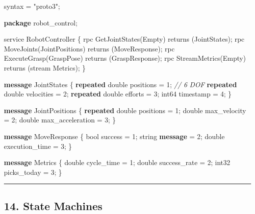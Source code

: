 \documentclass[
]{article}
\newenvironment{Shaded}{\begin{snugshade}}{\end{snugshade}}
\newcommand{\CommentTok}[1]{\textcolor[rgb]{0.56,0.35,0.01}{\textit{#1}}}
\newcommand{\DataTypeTok}[1]{\textcolor[rgb]{0.13,0.29,0.53}{#1}}
\newcommand{\DecValTok}[1]{\textcolor[rgb]{0.00,0.00,0.81}{#1}}
\newcommand{\KeywordTok}[1]{\textcolor[rgb]{0.13,0.29,0.53}{\textbf{#1}}}
\newcommand{\NormalTok}[1]{#1}
\newcommand{\StringTok}[1]{\textcolor[rgb]{0.31,0.60,0.02}{#1}}
\begin{document}
\begin{Shaded}
\begin{Highlighting}[]
\NormalTok{syntax = }\StringTok{"proto3"}\NormalTok{;}

\KeywordTok{package}\NormalTok{ robot\_control;}

\NormalTok{service RobotController \{}
\NormalTok{    rpc GetJointStates(Empty) returns (JointStates);}
\NormalTok{    rpc MoveJoints(JointPositions) returns (MoveResponse);}
\NormalTok{    rpc ExecuteGrasp(GraspPose) returns (GraspResponse);}
\NormalTok{    rpc StreamMetrics(Empty) returns (stream Metrics);}
\NormalTok{\}}

\KeywordTok{message}\NormalTok{ JointStates \{}
    \KeywordTok{repeated} \DataTypeTok{double}\NormalTok{ positions = }\DecValTok{1}\NormalTok{;  }\CommentTok{// 6 DOF}
    \KeywordTok{repeated} \DataTypeTok{double}\NormalTok{ velocities = }\DecValTok{2}\NormalTok{;}
    \KeywordTok{repeated} \DataTypeTok{double}\NormalTok{ efforts = }\DecValTok{3}\NormalTok{;}
    \DataTypeTok{int64}\NormalTok{ timestamp = }\DecValTok{4}\NormalTok{;}
\NormalTok{\}}

\KeywordTok{message}\NormalTok{ JointPositions \{}
    \KeywordTok{repeated} \DataTypeTok{double}\NormalTok{ positions = }\DecValTok{1}\NormalTok{;}
    \DataTypeTok{double}\NormalTok{ max\_velocity = }\DecValTok{2}\NormalTok{;}
    \DataTypeTok{double}\NormalTok{ max\_acceleration = }\DecValTok{3}\NormalTok{;}
\NormalTok{\}}

\KeywordTok{message}\NormalTok{ MoveResponse \{}
    \DataTypeTok{bool}\NormalTok{ success = }\DecValTok{1}\NormalTok{;}
    \DataTypeTok{string} \KeywordTok{message}\NormalTok{ = }\DecValTok{2}\NormalTok{;}
    \DataTypeTok{double}\NormalTok{ execution\_time = }\DecValTok{3}\NormalTok{;}
\NormalTok{\}}

\KeywordTok{message}\NormalTok{ Metrics \{}
    \DataTypeTok{double}\NormalTok{ cycle\_time = }\DecValTok{1}\NormalTok{;}
    \DataTypeTok{double}\NormalTok{ success\_rate = }\DecValTok{2}\NormalTok{;}
    \DataTypeTok{int32}\NormalTok{ picks\_today = }\DecValTok{3}\NormalTok{;}
\NormalTok{\}}
\end{Highlighting}
\end{Shaded}

\begin{center}\rule{0.5\linewidth}{0.5pt}\end{center}

\hypertarget{state-machines}{%
\subsection{14. State Machines}\label{state-machines}}
\end{document}
